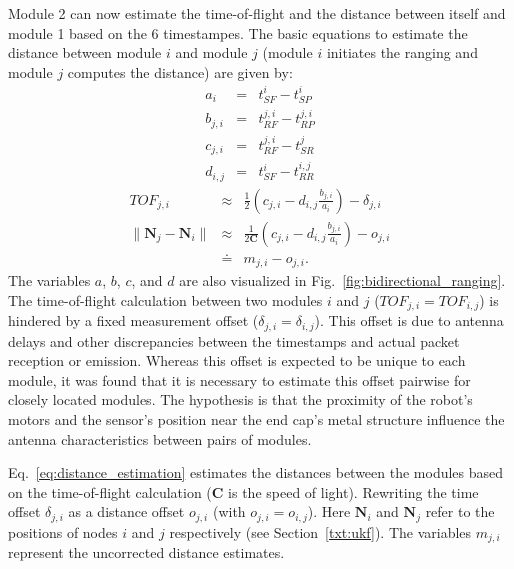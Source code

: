 Module 2 can now estimate the time-of-flight and the distance between itself and module 1 based on the 6 timestampes.
The basic equations to estimate the distance between module $i$ and module $j$ (module $i$ initiates the ranging and module $j$ computes the distance) are given by:
\begin{eqnarray} %
a_{i} &=& t_{SF}^i-t_{SP}^i\\
b_{j,i} &=& t_{RF}^{j,i}-t_{RP}^{j,i}\\ %
c_{j,i} &=& t_{RF}^{j,i}-t_{SR}^j\\  
d_{i,j} &=& t_{SF}^i-t_{RR}^{i,j} %
\end{eqnarray}
\begin{eqnarray}
{TOF}_{j,i}  &\approx& \frac{1}{2}\left(c_{j,i}-d_{i,j}\frac{b_{j,i}}{a_i} \right)-\delta_{j,i}\\
\|\bm{N}_j - \bm{N}_i\| &\approx& \frac{1}{2\bm{C}}\left(c_{j,i}-d_{i,j}\frac{b_{j,i}}{a_i} \right)-o_{j,i} \label{eq:distance_estimation}\\
&\doteq& m_{j,i}-o_{j,i} .
\end{eqnarray}
The variables $a$, $b$, $c$, and $d$ are also visualized in Fig.~\ref{fig:bidirectional_ranging}.
The time-of-flight calculation between two modules $i$ and $j$ ($TOF_{j,i}=TOF_{i,j}$) is hindered by a fixed measurement offset ($\delta_{j,i}=\delta_{i,j}$).
This offset is due to antenna delays and other discrepancies  between the timestamps and actual packet reception or emission.
Whereas this offset is expected to be unique to each module, it was found that it is necessary to estimate this offset pairwise for closely located modules.
The hypothesis is that the proximity of the robot's motors and the sensor's position near the end cap's metal structure influence the antenna characteristics between pairs of modules.

Eq.~\ref{eq:distance_estimation} estimates the distances between the modules based on the time-of-flight calculation ($\bm{C}$ is the speed of light).
Rewriting the time offset $\delta_{j,i}$ as a distance offset $o_{j,i}$ (with $o_{j,i}=o_{i,j}$).
Here $\bm{N}_i$ and $\bm{N}_j$ refer to the positions of nodes $i$ and $j$ respectively (see Section~\ref{txt:ukf}).
The variables $m_{j,i}$ represent the uncorrected distance estimates.



